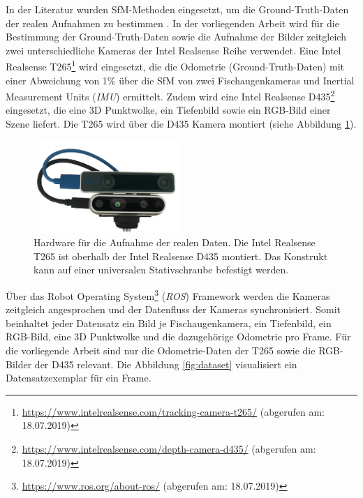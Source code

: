In der Literatur wurden SfM-Methoden eingesetzt, um die Ground-Truth-Daten der realen Aufnahmen zu bestimmen \cite{kendallPoseNetConvolutionalNetwork2015, clarkVidLocDeepSpatioTemporal2017, acharyaBIMPoseNetIndoorCamera2019}. 
In der vorliegenden Arbeit wird für die Bestimmung der Ground-Truth-Daten sowie die Aufnahme der Bilder zeitgleich zwei unterschiedliche Kameras der Intel Realsense Reihe verwendet. Eine Intel Realsense T265\footnote{\url{https://www.intelrealsense.com/tracking-camera-t265/} (abgerufen am: 18.07.2019)} wird eingesetzt, die die Odometrie (Ground-Truth-Daten) mit einer Abweichung von 1\%  über die SfM von zwei Fischaugenkameras und Inertial Measurement Units (\textit{IMU}) ermittelt. Zudem wird eine Intel Realsense D435\footnote{ \url{https://www.intelrealsense.com/depth-camera-d435/} (abgerufen am: 18.07.2019)} eingesetzt, die eine 3D Punktwolke, ein Tiefenbild sowie ein RGB-Bild einer Szene liefert. Die T265 wird über die D435 Kamera montiert (siehe Abbildung \ref{fig:t265_d435}). 

\begin{figure}[H]
	\centering
	\includegraphics[width=0.5\textwidth]{images/dataset/t265_d435_2.png}
	\caption{Hardware für die Aufnahme der realen Daten. Die Intel Realsense T265 ist oberhalb der Intel Realsense D435 montiert. Das Konstrukt kann auf einer universalen Stativschraube befestigt werden.  }
	\label{fig:t265_d435}
\end{figure}

Über das Robot Operating System\footnote{\url{https://www.ros.org/about-ros/} (abgerufen am: 18.07.2019)} (\textit{ROS}) Framework werden die Kameras zeitgleich angesprochen und der Datenfluss der Kameras synchronisiert. Somit beinhaltet jeder Datensatz ein Bild je Fischaugenkamera, ein Tiefenbild, ein RGB-Bild, eine 3D Punktwolke und die dazugehörige Odometrie pro Frame. Für die vorliegende Arbeit sind nur die Odometrie-Daten der T265 sowie die RGB-Bilder der D435 relevant. Die Abbildung \ref{fig:dataset} visualisiert ein Datensatzexemplar für ein Frame.


